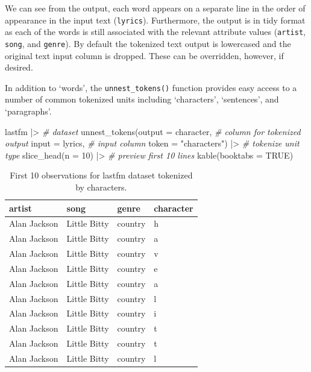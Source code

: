 \documentclass[
  letterpaper,
]{latex/krantz}
\newenvironment{Shaded}{\begin{snugshade}}{\end{snugshade}}
\newcommand{\AttributeTok}[1]{\textcolor[rgb]{0.00,0.00,0.00}{#1}}
\newcommand{\CommentTok}[1]{\textcolor[rgb]{0.00,0.00,0.00}{\textit{#1}}}
\newcommand{\ConstantTok}[1]{\textcolor[rgb]{0.00,0.00,0.00}{#1}}
\newcommand{\DecValTok}[1]{\textcolor[rgb]{0.00,0.00,0.00}{#1}}
\newcommand{\FunctionTok}[1]{\textcolor[rgb]{0.00,0.00,0.00}{#1}}
\newcommand{\NormalTok}[1]{\textcolor[rgb]{0.00,0.00,0.00}{#1}}
\newcommand{\SpecialCharTok}[1]{\textcolor[rgb]{0.00,0.00,0.00}{#1}}
\newcommand{\StringTok}[1]{\textcolor[rgb]{0.00,0.00,0.00}{#1}}
\begin{document}
We can see from the output, each word appears on a separate line in the
order of appearance in the input text (\texttt{lyrics}). Furthermore,
the output is in tidy format as each of the words is still associated
with the relevant attribute values (\texttt{artist}, \texttt{song}, and
\texttt{genre}). By default the tokenized text output is lowercased and
the original text input column is dropped. These can be overridden,
however, if desired.

In addition to `words', the \texttt{unnest\_tokens()} function provides
easy access to a number of common tokenized units including
`characters', `sentences', and `paragraphs'.

\begin{Shaded}
\begin{Highlighting}[]
\NormalTok{lastfm }\SpecialCharTok{|\textgreater{}} \CommentTok{\# dataset}
  \FunctionTok{unnest\_tokens}\NormalTok{(}\AttributeTok{output =}\NormalTok{ character, }\CommentTok{\# column for tokenized output}
                \AttributeTok{input =}\NormalTok{ lyrics, }\CommentTok{\# input column}
                \AttributeTok{token =} \StringTok{"characters"}\NormalTok{) }\SpecialCharTok{|\textgreater{}} \CommentTok{\# tokenize unit type}
  \FunctionTok{slice\_head}\NormalTok{(}\AttributeTok{n =} \DecValTok{10}\NormalTok{) }\SpecialCharTok{|\textgreater{}}  \CommentTok{\# preview first 10 lines}
  \FunctionTok{kable}\NormalTok{(}\AttributeTok{booktabs =} \ConstantTok{TRUE}\NormalTok{)}
\end{Highlighting}
\end{Shaded}

\hypertarget{tbl-td-lastfm-tokenize-characters}{}
\begin{table}
\caption{\label{tbl-td-lastfm-tokenize-characters}First 10 observations for lastfm dataset tokenized by characters. }\tabularnewline

\centering
\begin{tabular}{llll}
\toprule
artist & song & genre & character\\
\midrule
Alan Jackson & Little Bitty & country & h\\
Alan Jackson & Little Bitty & country & a\\
Alan Jackson & Little Bitty & country & v\\
Alan Jackson & Little Bitty & country & e\\
Alan Jackson & Little Bitty & country & a\\
\addlinespace
Alan Jackson & Little Bitty & country & l\\
Alan Jackson & Little Bitty & country & i\\
Alan Jackson & Little Bitty & country & t\\
Alan Jackson & Little Bitty & country & t\\
Alan Jackson & Little Bitty & country & l\\
\bottomrule
\end{tabular}
\end{table}
\end{document}

